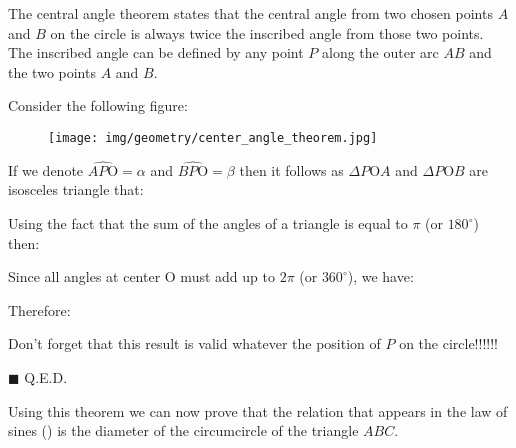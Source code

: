 	\begin{theorem}
	The central angle theorem states that the central angle from two chosen points $A$ and $B$ on the circle is always twice the inscribed angle from those two points. The inscribed angle can be defined by any point $P$ along the outer arc $AB$ and the two points $A$ and $B$.
	\end{theorem}

	\begin{dem}
	Consider the following figure:
	\begin{figure}[H]
		\centering
		\texttt{[image: img/geometry/center\_angle\_theorem.jpg]}
	\end{figure}
	If we denote $\widehat{AP\text{O}}=\alpha$ and $\widehat{BP\text{O}}=\beta$ then it follows as $\Delta P\text{O}A$ and $\Delta P\text{O}B$ are isosceles triangle that:
	
	Using the fact that the sum of the angles of a triangle is equal to $\pi$ (or $180^\circ$) then:
	
	Since all angles at center O must add up to $2\pi$ (or $360^\circ$), we have:
	
	Therefore:
	
	Don't forget that this result is valid whatever the position of $P$ on the circle!!!!!!
	\begin{flushright}
		$\blacksquare$  Q.E.D.
	\end{flushright}
	\end{dem}
	Using this theorem we can now prove that the relation that appears in the law of sines () is the diameter of the circumcircle of the triangle $ABC$.

